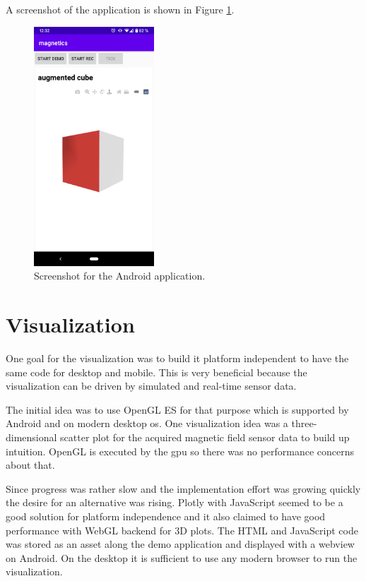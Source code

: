 A screenshot of the application is shown in Figure \ref{fig:app}.

\begin{figure}[hbt!]
    \centering
    \includegraphics[width=0.4\textwidth]{figures/app.png}
    \caption{Screenshot for the Android application.}
    \label{fig:app}
\end{figure}

\section{Visualization}

One goal for the visualization was to build it platform independent to have the same code for desktop and mobile. This is very beneficial because the visualization can be driven by simulated and real-time sensor data.

The initial idea was to use OpenGL ES for that purpose which is supported by Android and on modern desktop \gls{os}. One visualization idea was a three-dimensional scatter plot for the acquired magnetic field sensor data to build up intuition. OpenGL is executed by the \gls{gpu} so there was no performance concerns about that.

Since progress was rather slow and the implementation effort was growing quickly the desire for an alternative was rising. Plotly with JavaScript seemed to be a good solution for platform independence and it also claimed to have good performance with WebGL backend for 3D plots. The HTML and JavaScript code was stored as an asset along the demo application and displayed with a webview on Android. On the desktop it is sufficient to use any modern browser to run the visualization.

